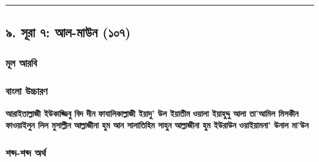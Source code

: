 \medskip\hrule\medskip

\subsection*{৯. সূরা ৭: আল-মাউন (১০৭)}

\subsubsection*{মূল আরবি}
\begin{center}\end{center}
\begin{center}\end{center}
\begin{center}\end{center}
\begin{center}\end{center}
\begin{center}\end{center}
\begin{center}\end{center}
\begin{center}\end{center}

\subsubsection*{বাংলা উচ্চারণ}
\textbf{আরাইতাল্লাজী ইউকাজ্জিবু বিদ দীন}
\textbf{ফাযালিকাল্লাজী ইয়াদু' উল ইয়াতীম}
\textbf{ওয়ালা ইয়াহুদ্দু আলা তা'আমিল মিসকীন}
\textbf{ফাওয়াইলুন লিল মুসাল্লীন}
\textbf{আল্লাজীনা হুম আন সালাতিহিম সাহুন}
\textbf{আল্লাজীনা হুম ইউরাউন}
\textbf{ওয়াইয়ামনা' উনাল মা'উন}

\subsubsection*{শব্দ-শব্দ অর্থ}

